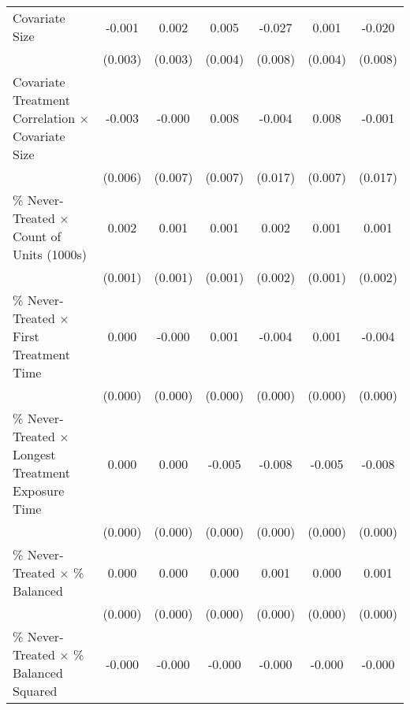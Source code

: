 \begin{table}[htbp]
\begin{tabular}{l*{6}{c}}
Covariate Size      &      -0.001         &       0.002         &       0.005         &      -0.027\sym{**} &       0.001         &      -0.020\sym{*}  \\
                    &     (0.003)         &     (0.003)         &     (0.004)         &     (0.008)         &     (0.004)         &     (0.008)         \\
Covariate Treatment Correlation $\times$ Covariate Size&      -0.003         &      -0.000         &       0.008         &      -0.004         &       0.008         &      -0.001         \\
                    &     (0.006)         &     (0.007)         &     (0.007)         &     (0.017)         &     (0.007)         &     (0.017)         \\
\% Never-Treated $\times$ Count of Units (1000s)&       0.002\sym{*}  &       0.001         &       0.001         &       0.002         &       0.001         &       0.001         \\
                    &     (0.001)         &     (0.001)         &     (0.001)         &     (0.002)         &     (0.001)         &     (0.002)         \\
\% Never-Treated $\times$ First Treatment Time&       0.000         &      -0.000         &       0.001\sym{***}&      -0.004\sym{***}&       0.001\sym{***}&      -0.004\sym{***}\\
                    &     (0.000)         &     (0.000)         &     (0.000)         &     (0.000)         &     (0.000)         &     (0.000)         \\
\% Never-Treated $\times$ Longest Treatment Exposure Time&       0.000\sym{*}  &       0.000\sym{***}&      -0.005\sym{***}&      -0.008\sym{***}&      -0.005\sym{***}&      -0.008\sym{***}\\
                    &     (0.000)         &     (0.000)         &     (0.000)         &     (0.000)         &     (0.000)         &     (0.000)         \\
\% Never-Treated $\times$ \% Balanced&       0.000\sym{***}&       0.000\sym{***}&       0.000         &       0.001\sym{***}&       0.000\sym{*}  &       0.001\sym{***}\\
                    &     (0.000)         &     (0.000)         &     (0.000)         &     (0.000)         &     (0.000)         &     (0.000)         \\
\% Never-Treated $\times$ \% Balanced Squared&      -0.000\sym{***}&      -0.000\sym{***}&      -0.000\sym{**} &      -0.000\sym{***}&      -0.000\sym{**} &      -0.000\sym{***}\\

\end{tabular}
\end{table}

